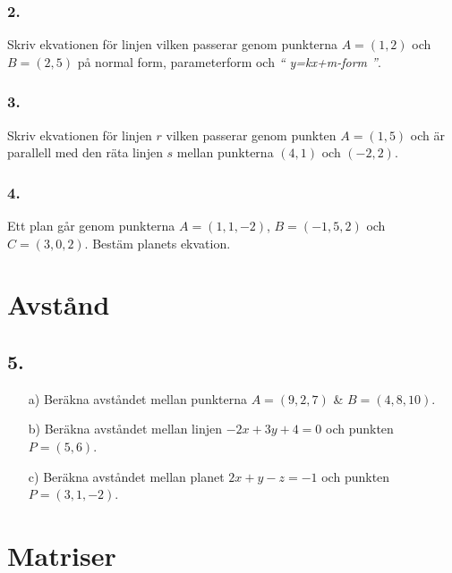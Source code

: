 \documentclass{article}
\begin{document}
\subsubsection*{2.}
Skriv ekvationen för linjen vilken passerar genom punkterna $A=(1,2)$ och 
$B=(2,5)$ på normal form, parameterform och {\it `` y=kx+m-form ''}.

\subsubsection*{3.}
Skriv ekvationen för linjen $r$ vilken passerar genom punkten $A=(1,5)$ och 
är parallell med den räta linjen $s$ mellan punkterna $(4,1)$ och $(-2,2)$.

\subsubsection*{4.}
Ett plan går genom punkterna $A=(1,1,-2)$, $B=(-1,5,2)$ och $C=(3,0,2)$.
Bestäm planets ekvation.\\

\section*{Avstånd}
\subsection*{5.}
\begin{itemize}
    \item[a) ] Beräkna avståndet mellan punkterna $A=(9,2,7)$ \& $B=(4,8,10)$.
    \item[b) ] Beräkna avståndet mellan linjen $-2x+3y+4=0$ och punkten 
               $P=(5,6)$.
    \item[c) ] Beräkna avståndet mellan planet $2x+y-z=-1$ och punkten 
               $P=(3,1,-2)$.
\end{itemize}

\section*{Matriser}
\end{document}

